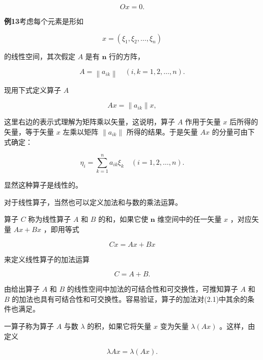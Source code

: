 \begin{equation*}
O x = 0.
\end{equation*}

\textbf{例13}\quad 考虑每个元素是形如

\begin{equation*}
x = (\xi_ {1}, \xi_ {2}, \dots , \xi_ {n})
\end{equation*}

的线性空间，其次假定 $A$ 是有 $\pmb{n}$ 行的方阵，

\begin{equation*}
A = \left\| a _ {i k} \right\| \quad (i, k = 1, 2, \dots , n).
\end{equation*}

现用下式定义算子 $A$

\begin{equation*}
A x = \parallel a _ {i k} \parallel x,\tag{2.41}
\end{equation*}

这里右边的表示式理解为矩阵乘以矢量，这说明，算子 $A$ 作用于矢量 $x$ 后所得的矢量，等于矢量 $x$ 左乘以矩阵 $\|a_{ik}\|$ 所得的结果。于是矢量 $Ax$ 的分量可由下式确定：

\begin{equation*}
\eta_ {i} = \sum_ {k = 1} ^ {n} a _ {i k} \xi_ {k} \quad (i = 1, 2, \dots , n).
\end{equation*}

显然这种算子是线性的。

对于线性算子，当然也可以定义加法和与数的乘法运算。

算子 $C$ 称为线性算子 $A$ 和 $B$ 的和，如果它使 $\pmb{n}$ 维空间中的任一矢量 $x$ ，对应矢量 $Ax + Bx$ ，即用等式

\begin{equation*}
C x = A x + B x\tag{2.42a}
\end{equation*}

来定义线性算子的加法运算

\begin{equation*}
C = A + B.
\end{equation*}

由给出算子 $A$ 和 $B$ 的线性空间中加法的可结合性和可交换性，可推知算子 $A$ 和 $B$ 的加法也具有可结合性和可交换性。容易验证，算子的加法对(2.1)中其余的条件也满足。

一算子称为算子 $A$ 与数 $\lambda$ 的积，如果它将矢量 $x$ 变为矢量 $\lambda(Ax)$ 。这样，由定义

\begin{equation*}
\lambda A x = \lambda (A x).\tag{2.42b}
\end{equation*}

